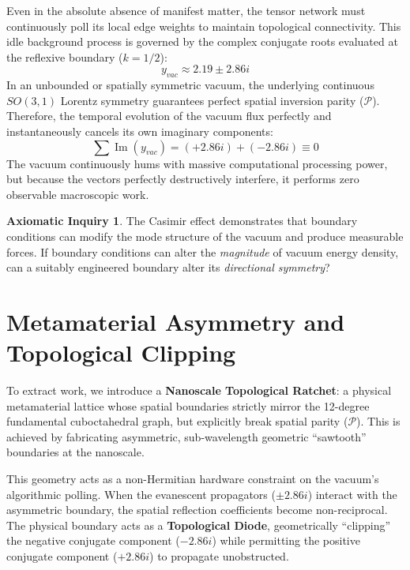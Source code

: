 \documentclass[11pt, letterpaper]{article}
\DeclareMathOperator{\ImOp}{Im}
\theoremstyle{definition}
\newtheorem{inquiry}{Axiomatic Inquiry}[section]
\theoremstyle{remark}
\begin{document}
Even in the absolute absence of manifest matter, the tensor network must continuously poll its local edge weights to maintain topological connectivity. This idle background process is governed by the complex conjugate roots evaluated at the reflexive boundary ($k=1/2$):
\begin{equation}
    y_{vac} \approx 2.19 \pm 2.86i
\end{equation}
In an unbounded or spatially symmetric vacuum, the underlying continuous $SO(3,1)$ Lorentz symmetry guarantees perfect spatial inversion parity ($\mathcal{P}$). Therefore, the temporal evolution of the vacuum flux perfectly and instantaneously cancels its own imaginary components:
\begin{equation}
    \sum \ImOp(y_{vac}) = (+2.86i) + (-2.86i) \equiv 0
\end{equation}
The vacuum continuously hums with massive computational processing power, but because the vectors perfectly destructively interfere, it performs zero observable macroscopic work.

\begin{inquiry}
The Casimir effect \cite{Casimir1948} demonstrates that boundary conditions can modify the mode structure of the vacuum and produce measurable forces. If boundary conditions can alter the \textit{magnitude} of vacuum energy density, can a suitably engineered boundary alter its \textit{directional symmetry}?
\end{inquiry}

\section{Metamaterial Asymmetry and Topological Clipping}

To extract work, we introduce a \textbf{Nanoscale Topological Ratchet}: a physical metamaterial lattice whose spatial boundaries strictly mirror the 12-degree fundamental cuboctahedral graph, but explicitly break spatial parity ($\mathcal{P}$). This is achieved by fabricating asymmetric, sub-wavelength geometric ``sawtooth'' boundaries at the nanoscale.

This geometry acts as a non-Hermitian hardware constraint on the vacuum's algorithmic polling. When the evanescent propagators ($\pm 2.86i$) interact with the asymmetric boundary, the spatial reflection coefficients become non-reciprocal. The physical boundary acts as a \textbf{Topological Diode}, geometrically ``clipping'' the negative conjugate component ($-2.86i$) while permitting the positive conjugate component ($+2.86i$) to propagate unobstructed.
\end{document}
